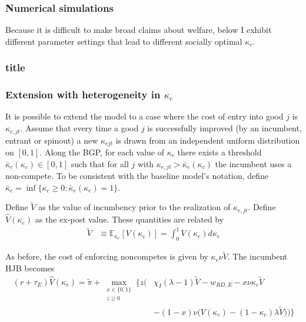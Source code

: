 \subsubsection{Numerical simulations}

Because it is difficult to make broad claims about welfare, below I exhibit different parameter settings that lead to different socially optimal $\kappa_c$. 

\subsubsection{title}

\subsubsection{Extension with heterogeneity in $\kappa_e$}

It is possible to extend the model to a case where the cost of entry into good $j$ is $\kappa_{e,jt}$. Assume that every time a good $j$ is successfully improved (by an incumbent, entrant or spinout) a new $\kappa_{ejt}$ is drawn from an independent uniform distribution on $[0,1]$. Along the BGP, for each value of $\kappa_c$ there exists a threshold $\bar{\kappa}_{e}(\kappa_c) \in [0,1]$ such that for all $j$ with $\kappa_{e,jt} > \bar{\kappa}_{e} (\kappa_c) $ the incumbent uses a non-compete. To be consistent with the baseline model's notation, define $\bar{\kappa}_c = \inf \{\kappa_c \ge 0: \bar{\kappa}_e(\kappa_c) = 1 \}$.  

Define $\tilde{V}$ as the value of incumbency prior to the realization of $\kappa_{e,jt}$. Define $\hat{V}(\kappa_e)$ as the ex-post value. These quantities are related by 
\begin{align}
	\tilde{V} &\equiv \mathbb{E}_{\kappa_e} [V(\kappa_e)] = \int_0^1 V(\kappa_e) d\kappa_e
\end{align}

As before, the cost of enforcing noncompetes is given by $\kappa_c \nu \tilde{V}$. The incumbent HJB becomes
\begin{align}
	(r + \tau_E) \hat{V}(\kappa_e) = \tilde{\pi} + \max_{\substack{x \in \{0,1\} \\ z \ge 0}} \Bigg\{ z \Big( &\chi_I(\lambda - 1) \tilde{V} - w_{RD,E} - x \nu \kappa_c \tilde{V} \nonumber \\
	&- (1-x) \nu \big( V(\kappa_e) - (1-\kappa_e) \lambda \tilde{V} \big)   \Big)  \Bigg\} \label{ext:hjb_incumbent}
\end{align}

